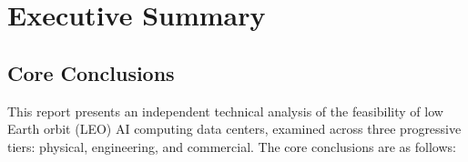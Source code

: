 
\section*{Executive Summary}

\subsection*{Core Conclusions}

This report presents an independent technical analysis of the feasibility of low Earth orbit (LEO) AI computing data centers, examined across three progressive tiers: physical, engineering, and commercial. The core conclusions are as follows:

